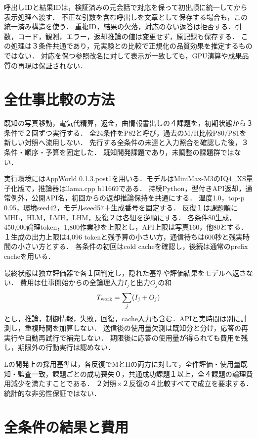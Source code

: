 \documentclass[uplatex,a4paper,twocolumn,10pt]{jsarticle}
\begin{document}
呼出しIDと結果IDは，検証済みの元会話で対応を保って初出順に統一してから表示処理へ渡す．
不正な引数を含む呼出しを文章として保存する場合も，この統一済み構造を使う．
重複ID，結果の欠落，対応のない返答は拒否する．引数，コード，観測，エラー，返却推論の値は変更せず，原記録も保存する．
この処理は３条件共通であり，元実験との比較で正規化の品質効果を推定するものではない．
対応を保つ参照改名に対して表示が一致しても，GPU演算や成果品質の再現は保証されない．

\section{全仕事比較の方法}
既知の写真移動，電気代精算，返金，曲情報書出しの４課題を，初期状態から３条件で２回ずつ実行する．
全24条件をP82と呼び，過去のM/H比較P80/P81を新しい対照へ流用しない．
先行する全条件の未達と入力照合を確認した後，３条件・順序・予算を固定した．
既知開発課題であり，未調整の課題群ではない．

実行環境にはAppWorld 0.1.3.post1を用いる．モデルはMiniMax-M3のIQ4\_XS量子化版で，推論器はllama.cpp b11669である．
持続Python，型付きAPI返却，通常例外，公開API名，初回からの返却推論保持を共通にする．
温度1.0，top-p 0.95，環境seed42，モデルseed57＋生成番号を固定する．
反復１は課題順にMHL，HLM，LMH，LHM，反復２は各組を逆順にする．
各条件80生成，450,000論理token，1,800作業秒を上限とし，API上限は写真160，他80とする．
１生成の出力上限は4,096 tokenと残予算の小さい方，通信待ちは600秒と残実時間の小さい方とする．
各条件の初回はcold cacheを確認し，後続は通常のprefix cacheを用いる．

最終状態は独立評価器で各１回判定し，隠れた基準や評価結果をモデルへ返さない．
費用は仕事開始からの全論理入力$I_j$と出力$O_j$の和
\begin{equation}T_{\rm work}=\sum_j(I_j+O_j)\end{equation}
とし，推論，制御情報，失敗，回復，cache入力も含む．APIと実時間は別に計測し，重複時間を加算しない．
送信後の使用量欠測は既知分と分け，応答の再実行や自動再試行で補完しない．
期限後に応答の使用量が得られても費用を残し，期限外の行動実行は認めない．

Lの開発上の採用基準は，各反復でMとHの両方に対して，全件評価・使用量既知・監査一致，課題ごとの成功喪失０，共通成功課題１以上，全４課題の論理費用減少を満たすことである．
２対照×２反復の４比較すべてで成立を要求する．統計的な非劣性保証ではない．

\section{全条件の結果と費用}

\end{document}
